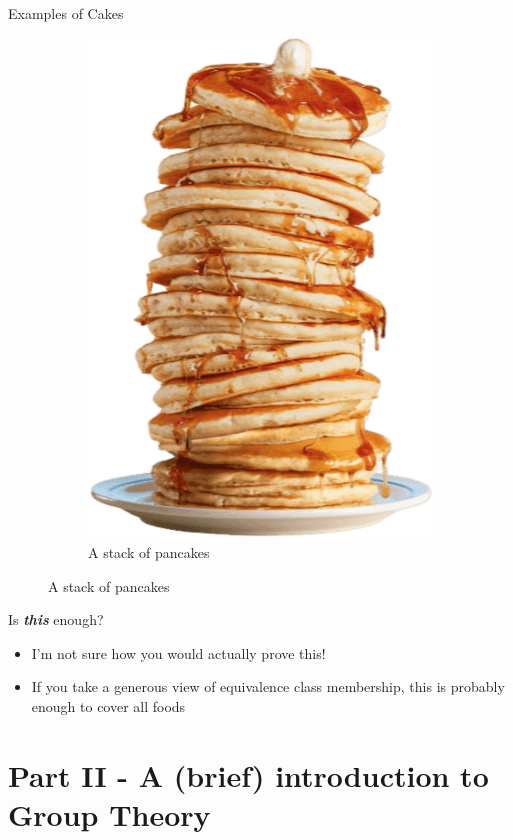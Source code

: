 \documentclass{beamer}
\begin{document}
\begin{frame}{Examples of Cakes}
\begin{figure}
\begin{subfigure}{.35\textwidth}
          \includegraphics[width=.8\linewidth]{cake/33_flapjacks.png}
          \caption{\label{fig:pancake-stack}A stack of pancakes}
        \end{subfigure}
    \end{figure}
\end{frame}


\begin{frame}{Is \textit{\textbf{this}} enough?}
    \begin{itemize}
        \item I'm not sure how you would actually prove this!
        \item If you take a generous view of equivalence class membership, this is probably enough to cover all foods
    \end{itemize}
\end{frame}


\section{Part II - A (brief) introduction to Group Theory}
\end{document}
